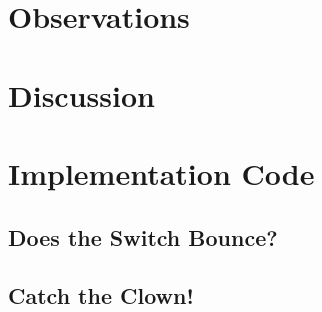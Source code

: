 \documentclass[11pt]{article}
\begin{document}
\section{Observations}

\section{Discussion}

\clearpage

\section{Implementation Code}

\subsection{Does the Switch Bounce?}
\label{debounce-time-code}


\clearpage
\subsection{Catch the Clown!}
\label{catch-the-clown-code}

\end{document}
